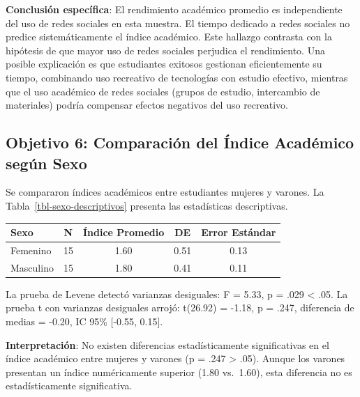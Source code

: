 \documentclass[
  stu,
  floatsintext,
  longtable,
  a4paper,
  nolmodern,
  notxfonts,
  notimes,
  12pt,
  colorlinks=true,linkcolor=blue,citecolor=blue,urlcolor=blue]{apa7}
\newcounter{none} %
\begin{document}
\textbf{Conclusión específica}: El rendimiento académico promedio es
independiente del uso de redes sociales en esta muestra. El tiempo
dedicado a redes sociales no predice sistemáticamente el índice
académico. Este hallazgo contrasta con la hipótesis de que mayor uso de
redes sociales perjudica el rendimiento. Una posible explicación es que
estudiantes exitosos gestionan eficientemente su tiempo, combinando uso
recreativo de tecnologías con estudio efectivo, mientras que el uso
académico de redes sociales (grupos de estudio, intercambio de
materiales) podría compensar efectos negativos del uso recreativo.

\subsection{Objetivo 6: Comparación del Índice Académico según
Sexo}\label{objetivo-6-comparaciuxf3n-del-uxedndice-acaduxe9mico-seguxfan-sexo}

Se compararon índices académicos entre estudiantes mujeres y varones. La
Tabla~\ref{tbl-sexo-descriptivos} presenta las estadísticas
descriptivas.

\begin{table}

{\caption{{Estadísticas Descriptivas del Índice Académico según
Sexo}{\label{tbl-sexo-descriptivos}}}}

{\def\LTcaptype{none} %
\begin{longtable}[]{@{}lcccc@{}}
\toprule\noalign{}
Sexo & N & Índice Promedio & DE & Error Estándar \\
\midrule\noalign{}
\endhead
\bottomrule\noalign{}
\endlastfoot
Femenino & 15 & 1.60 & 0.51 & 0.13 \\
Masculino & 15 & 1.80 & 0.41 & 0.11 \\
\end{longtable}
}

\end{table}

La prueba de Levene detectó varianzas desiguales: F = 5.33, p = .029
\textless{} .05. La prueba t con varianzas desiguales arrojó: t(26.92) =
-1.18, p = .247, diferencia de medias = -0.20, IC 95\% {[}-0.55,
0.15{]}.

\textbf{Interpretación}: No existen diferencias estadísticamente
significativas en el índice académico entre mujeres y varones (p = .247
\textgreater{} .05). Aunque los varones presentan un índice
numéricamente superior (1.80 vs.~1.60), esta diferencia no es
estadísticamente significativa.
\end{document}
